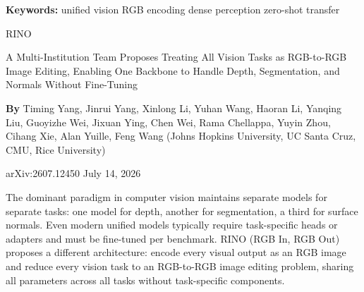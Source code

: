 \documentclass[10pt,twocolumn]{article}
\begin{document}
\setlength{\parindent}{0pt}
\setlength{\parskip}{4pt}

{\small\color{keywordgray}\textbf{Keywords:}
  unified vision \textbullet{}
  RGB encoding \textbullet{}
  dense perception \textbullet{}
  zero-shot transfer}\par\vspace{4pt}

{\LARGE\bfseries\raggedright
  RINO}\par\vspace{4pt}

{\large\itshape\raggedright
  A Multi-Institution Team Proposes Treating All Vision Tasks
  as RGB-to-RGB Image Editing, Enabling One Backbone to Handle
  Depth, Segmentation, and Normals Without Fine-Tuning}\par\vspace{6pt}

{\small\textbf{By} Timing Yang, Jinrui Yang, Xinlong Li, Yuhan Wang,
  Haoran Li, Yanqing Liu, Guoyizhe Wei, Jixuan Ying, Chen Wei,
  Rama Chellappa, Yuyin Zhou, Cihang Xie, Alan Yuille, Feng Wang
  (Johns Hopkins University, UC Santa Cruz, CMU, Rice
  University)}\par\vspace{2pt}

{\small\color{keywordgray}arXiv:2607.12450 \textbullet{}
  July 14, 2026}
\par\vspace{2pt}\noindent{\color{rulered}\rule{\columnwidth}{0.6pt}}\vspace{6pt}

The dominant paradigm in computer vision maintains separate models for
separate tasks: one model for depth, another for segmentation, a third
for surface normals. Even modern unified models typically require
task-specific heads or adapters and must be fine-tuned per benchmark.
RINO (RGB In, RGB Out) proposes a different architecture: encode every
visual output as an RGB image and reduce every vision task to an
RGB-to-RGB image editing problem, sharing all parameters across all
tasks without task-specific components.
\end{document}
